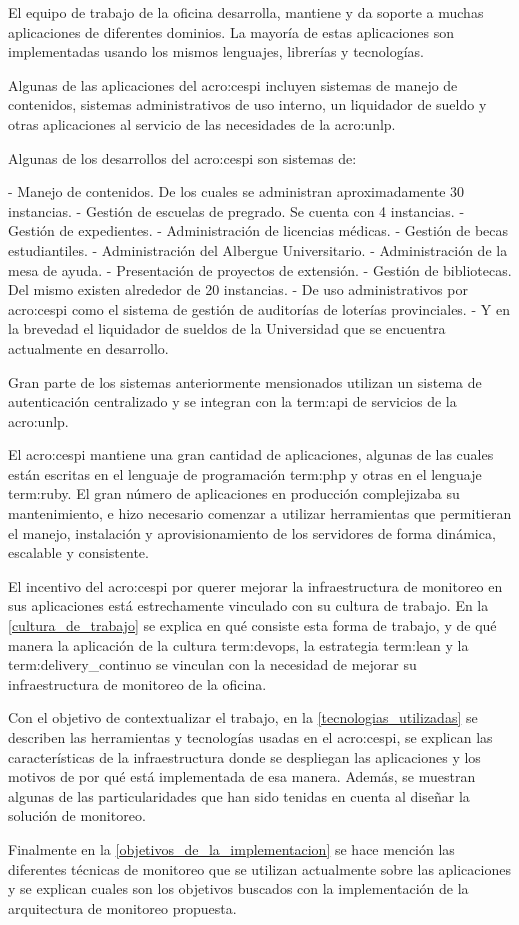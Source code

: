 El equipo de trabajo de la oficina desarrolla, mantiene y da soporte a muchas
aplicaciones de diferentes dominios. La mayoría de estas aplicaciones son
implementadas usando los mismos lenguajes, librerías y tecnologías.

Algunas de las aplicaciones del \gls{acro:cespi} incluyen sistemas de manejo de
contenidos, sistemas administrativos de uso interno, un liquidador de sueldo y
otras aplicaciones al servicio de las necesidades de la \gls{acro:unlp}.

Algunas de los desarrollos del \gls{acro:cespi} son sistemas de:

- Manejo de contenidos. De los cuales se administran aproximadamente 30 instancias.
- Gestión de escuelas de pregrado. Se cuenta con 4 instancias.
- Gestión de expedientes.
- Administración de licencias médicas.
- Gestión de becas estudiantiles.
- Administración del Albergue Universitario.
- Administración de la mesa de ayuda.
- Presentación de proyectos de extensión.
- Gestión de bibliotecas. Del mismo existen alrededor de 20 instancias.
- De uso administrativos por \gls{acro:cespi} como el sistema de gestión de
auditorías de loterías provinciales.
- Y en la brevedad el liquidador de sueldos de la Universidad que se encuentra
actualmente en desarrollo.

Gran parte de los sistemas anteriormente mensionados utilizan un sistema de
autenticación centralizado y se integran con la \gls{term:api} de servicios de
la \gls{acro:unlp}.

El \gls{acro:cespi} mantiene una gran cantidad de aplicaciones, algunas de las
cuales están escritas en el lenguaje de programación \gls{term:php} y otras en
el lenguaje \gls{term:ruby}. El gran número de aplicaciones en producción
complejizaba su mantenimiento, e hizo necesario comenzar a utilizar
herramientas que permitieran el manejo, instalación y aprovisionamiento de los
servidores de forma dinámica, escalable y consistente.

El incentivo del \gls{acro:cespi} por querer mejorar la infraestructura de
monitoreo en sus aplicaciones está estrechamente vinculado con su cultura de
trabajo. En la \autoref{cultura_de_trabajo} se explica en qué consiste esta
forma de trabajo, y de qué manera la aplicación de la cultura \gls{term:devops},
la estrategia \gls{term:lean} y la \gls{term:delivery_continuo} se vinculan con
la necesidad de mejorar su infraestructura de monitoreo de la oficina.

Con el objetivo de contextualizar el trabajo, en la
\autoref{tecnologias_utilizadas} se describen las herramientas y tecnologías
usadas en el \gls{acro:cespi}, se explican las características de la
infraestructura donde se despliegan las aplicaciones y los motivos de por qué
está implementada de esa manera. Además, se muestran algunas de las
particularidades que han sido tenidas en cuenta al diseñar la solución de
monitoreo.

Finalmente en la \autoref{objetivos_de_la_implementacion} se hace mención
las diferentes técnicas de monitoreo que se utilizan actualmente sobre las
aplicaciones y se explican cuales son los objetivos buscados con la
implementación de la arquitectura de monitoreo propuesta.

